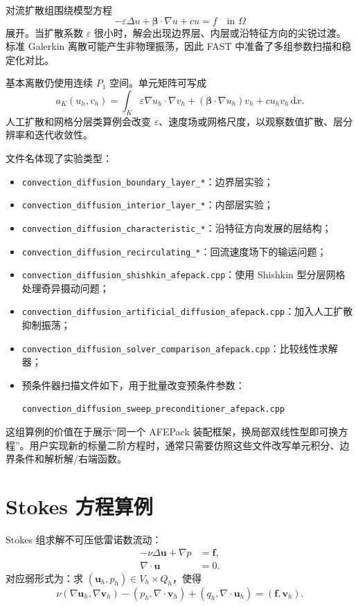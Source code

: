 \documentclass[UTF8,openany,zihao=-4,scheme=chinese]{ctexbook}
\newcommand{\file}[1]{\nolinkurl{#1}}
\begin{document}
对流扩散组围绕模型方程
\[
  -\varepsilon\Delta u + \boldsymbol\beta\cdot\nabla u + c u = f
  \quad \text{in }\Omega
\]
展开。当扩散系数 $\varepsilon$ 很小时，解会出现边界层、内层或沿特征方向的尖锐过渡。标准 Galerkin 离散可能产生非物理振荡，因此 FAST 中准备了多组参数扫描和稳定化对比。

基本离散仍使用连续 $P_1$ 空间。单元矩阵可写成
\[
  a_K(u_h,v_h)=
  \int_K \varepsilon\nabla u_h\cdot\nabla v_h
  +(\boldsymbol\beta\cdot\nabla u_h)v_h
  +c u_h v_h\,\mathrm dx .
\]
人工扩散和网格分层类算例会改变 $\varepsilon$、速度场或网格尺度，以观察数值扩散、层分辨率和迭代收敛性。

文件名体现了实验类型：

\begin{itemize}[leftmargin=2em]
  \item \file{convection\_diffusion\_boundary\_layer\_*}：边界层实验；
  \item \file{convection\_diffusion\_interior\_layer\_*}：内部层实验；
  \item \file{convection\_diffusion\_characteristic\_*}：沿特征方向发展的层结构；
  \item \file{convection\_diffusion\_recirculating\_*}：回流速度场下的输运问题；
  \item \file{convection\_diffusion\_shishkin\_afepack.cpp}：使用 Shishkin 型分层网格处理奇异摄动问题；
  \item \file{convection\_diffusion\_artificial\_diffusion\_afepack.cpp}：加入人工扩散抑制振荡；
  \item \file{convection\_diffusion\_solver\_comparison\_afepack.cpp}：比较线性求解器；
  \item 预条件器扫描文件如下，用于批量改变预条件参数：
\begin{lstlisting}[language=bash]
convection_diffusion_sweep_preconditioner_afepack.cpp
\end{lstlisting}
\end{itemize}

这组算例的价值在于展示“同一个 AFEPack 装配框架，换局部双线性型即可换方程”。用户实现新的标量二阶方程时，通常只需要仿照这些文件改写单元积分、边界条件和解析解/右端函数。

\section{Stokes 方程算例}

Stokes 组求解不可压低雷诺数流动：
\[
\begin{aligned}
  -\nu\Delta\boldsymbol u + \nabla p &= \boldsymbol f,\\
  \nabla\cdot\boldsymbol u &= 0.
\end{aligned}
\]
对应弱形式为：求 $(\boldsymbol u_h,p_h)\in V_h\times Q_h$，使得
\[
  \nu(\nabla\boldsymbol u_h,\nabla\boldsymbol v_h)
  -(p_h,\nabla\cdot\boldsymbol v_h)
  +(q_h,\nabla\cdot\boldsymbol u_h)
  =(\boldsymbol f,\boldsymbol v_h).
\]
\end{document}
